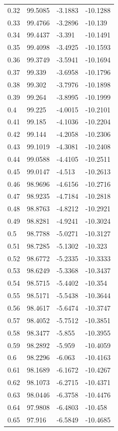 \begin{tabular}{llll}
0.32 & 99.5085 & -3.1883 & -10.1288 \\
0.33 & 99.4766 & -3.2896 & -10.139 \\
0.34 & 99.4437 & -3.391 & -10.1491 \\
0.35 & 99.4098 & -3.4925 & -10.1593 \\
0.36 & 99.3749 & -3.5941 & -10.1694 \\
0.37 & 99.339 & -3.6958 & -10.1796 \\
0.38 & 99.302 & -3.7976 & -10.1898 \\
0.39 & 99.264 & -3.8995 & -10.1999 \\
0.4 & 99.225 & -4.0015 & -10.2101 \\
0.41 & 99.185 & -4.1036 & -10.2204 \\
0.42 & 99.144 & -4.2058 & -10.2306 \\
0.43 & 99.1019 & -4.3081 & -10.2408 \\
0.44 & 99.0588 & -4.4105 & -10.2511 \\
0.45 & 99.0147 & -4.513 & -10.2613 \\
0.46 & 98.9696 & -4.6156 & -10.2716 \\
0.47 & 98.9235 & -4.7184 & -10.2818 \\
0.48 & 98.8763 & -4.8212 & -10.2921 \\
0.49 & 98.8281 & -4.9241 & -10.3024 \\
0.5 & 98.7788 & -5.0271 & -10.3127 \\
0.51 & 98.7285 & -5.1302 & -10.323 \\
0.52 & 98.6772 & -5.2335 & -10.3333 \\
0.53 & 98.6249 & -5.3368 & -10.3437 \\
0.54 & 98.5715 & -5.4402 & -10.354 \\
0.55 & 98.5171 & -5.5438 & -10.3644 \\
0.56 & 98.4617 & -5.6474 & -10.3747 \\
0.57 & 98.4052 & -5.7512 & -10.3851 \\
0.58 & 98.3477 & -5.855 & -10.3955 \\
0.59 & 98.2892 & -5.959 & -10.4059 \\
0.6 & 98.2296 & -6.063 & -10.4163 \\
0.61 & 98.1689 & -6.1672 & -10.4267 \\
0.62 & 98.1073 & -6.2715 & -10.4371 \\
0.63 & 98.0446 & -6.3758 & -10.4476 \\
0.64 & 97.9808 & -6.4803 & -10.458 \\
0.65 & 97.916 & -6.5849 & -10.4685 \\

\end{tabular}
